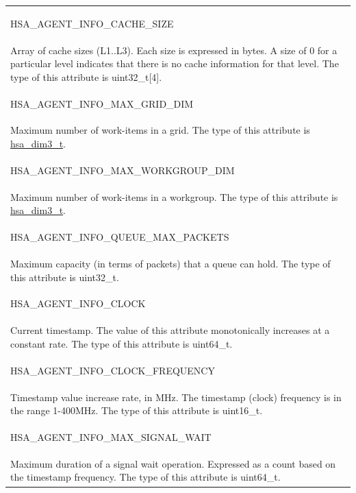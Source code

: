 \documentclass[final]{book}
\newcommand{\reftyp}[1]{#1}
\newcommand{\refenu}[1]{\reftyp{#1}}
\begin{document}
\begin{longtable}{@{\hspace{2em}}p{\linewidth-2em}}
\hspace{-2em}\hypertarget{group__agentinfo_1gga39d0684207d95717d96319573b3e4a42ae7fe21528c215249472e5836631759f4}{\refenu{HSA_\-AGENT_\-INFO_\-CACHE_\-SIZE}} \\Array of cache sizes (L1..L3). Each size is expressed in bytes. A size of 0 for a particular level indicates that there is no cache information for that level. The type of this attribute is uint32_\-t[4].\\[2mm]
\hspace{-2em}\hypertarget{group__agentinfo_1gga39d0684207d95717d96319573b3e4a42a5aded93836a855974be9703243595629}{\refenu{HSA_\-AGENT_\-INFO_\-MAX_\-GRID_\-DIM}} \\Maximum number of work-items in a grid. The type of this attribute is \hyperlink{group__common_1ga6f7883588491965c45382cd996351aa2}{hsa_\-dim3_\-t}.\\[2mm]
\hspace{-2em}\hypertarget{group__agentinfo_1gga39d0684207d95717d96319573b3e4a42a0e0c6a2948a9fe20b31f5aa461bbc934}{\refenu{HSA_\-AGENT_\-INFO_\-MAX_\-WORKGROUP_\-DIM}} \\Maximum number of work-items in a workgroup. The type of this attribute is \hyperlink{group__common_1ga6f7883588491965c45382cd996351aa2}{hsa_\-dim3_\-t}.\\[2mm]
\hspace{-2em}\hypertarget{group__agentinfo_1gga39d0684207d95717d96319573b3e4a42a90b63966abee45999d9564505c854a95}{\refenu{HSA_\-AGENT_\-INFO_\-QUEUE_\-MAX_\-PACKETS}} \\Maximum capacity (in terms of packets) that a queue can hold. The type of this attribute is uint32_\-t.\\[2mm]
\hspace{-2em}\hypertarget{group__agentinfo_1gga39d0684207d95717d96319573b3e4a42a07a6f0968fe3caec18cf7c72137f1972}{\refenu{HSA_\-AGENT_\-INFO_\-CLOCK}} \\Current timestamp. The value of this attribute monotonically increases at a constant rate. The type of this attribute is uint64_\-t.\\[2mm]
\hspace{-2em}\hypertarget{group__agentinfo_1gga39d0684207d95717d96319573b3e4a42aba47a306649ecfcca0f55aba04259132}{\refenu{HSA_\-AGENT_\-INFO_\-CLOCK_\-FREQUENCY}} \\Timestamp value increase rate, in MHz. The timestamp (clock) frequency is in the range 1-400MHz. The type of this attribute is uint16_\-t.\\[2mm]
\hspace{-2em}\hypertarget{group__agentinfo_1gga39d0684207d95717d96319573b3e4a42a9067b2093dddb93232232a31b2bbac13}{\refenu{HSA_\-AGENT_\-INFO_\-MAX_\-SIGNAL_\-WAIT}} \\Maximum duration of a signal wait operation. Expressed as a count based on the timestamp frequency. The type of this attribute is uint64_\-t.
\end{longtable}
\end{document}
